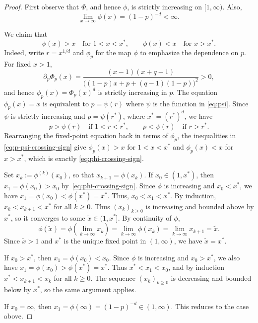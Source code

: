 \documentclass[11pt]{amsart}
\theoremstyle{plain}
\theoremstyle{definition}
\theoremstyle{remark}
\begin{document}
\begin{proof}
First observe that \(\Phi\), and hence \(\phi\), is strictly increasing on \([1,\infty)\). Also,
\[
    \lim_{x\to\infty}\phi(x)=(1-p)^{-d}<\infty.
\]

We claim that
\begin{equation}\label{eq:phi-crossing-sign}
    \phi(x)>x \quad\text{for }1<x<x^*,
    \qquad
    \phi(x)<x \quad\text{for }x>x^*.
\end{equation}
Indeed, write \(r=x^{1/d}\) and $\phi_p$ for the map $\phi$ to emphasize the dependence on $p$. For fixed \(x>1\),
\[
    \partial_p\Phi_p(x)
    =
    \frac{(x-1)(x+q-1)}
    {\bigl((1-p)x+p+(q-1)(1-p)\bigr)^2}
    >0,
\]
and hence $\phi_p(x)=\Phi_p(x)^d$ is strictly increasing in $p$. The equation \(\phi_p(x)=x\) is equivalent to \(p=\psi(r)\) where $\psi$ is the function in \eqref{eq:psi}. Since \(\psi\) is strictly increasing and \(p=\psi(r^*)\), where \(x^*=(r^*)^d\), we have
\begin{equation}\label{eq:p-psi-crossing-sign}
    p>\psi(r) \quad\text{if }1<r<r^*,
    \qquad
    p<\psi(r) \quad\text{if }r>r^*.
\end{equation}
Rearranging the fixed-point equation back in terms of \(\phi_p\), the inequalities in \eqref{eq:p-psi-crossing-sign} give \(\phi_p(x)>x\) for \(1<x<x^*\) and \(\phi_p(x)<x\) for \(x>x^*\), which is exactly \eqref{eq:phi-crossing-sign}.

Set $x_k:=\phi^{(k)}(x_0)$, so that $x_{k+1}=\phi(x_k)$. If \(x_0\in(1,x^*)\), then $x_1=\phi(x_0)>x_0$ by~\eqref{eq:phi-crossing-sign}. Since $\phi$ is increasing and $x_0<x^*$, we have $x_1=\phi(x_0)<\phi(x^*)=x^*$. Thus, $x_0<x_1<x^*$. By induction, $x_k<x_{k+1}<x^*$ for all $k\ge0$. Thus \((x_k)_{k\ge0}\) is increasing and bounded above by \(x^*\), so it converges to some $\tilde x \in (1,x^*]$. By continuity of \(\phi\),
\[
    \phi(\tilde x)
    =\phi\left(\lim_{k\to\infty}x_k\right)
    =\lim_{k\to\infty}\phi\left(x_k\right)
    =\lim_{k\to\infty}x_{k+1}
    =\tilde x.
\]
Since $\tilde x>1$ and $x^*$ is the unique fixed point in $(1, \infty)$, we have $\tilde x = x^*$.

If \(x_0>x^*\), then \(x_1=\phi(x_0)<x_0\). Since \(\phi\) is increasing and \(x_0>x^*\), we also have \(x_1=\phi(x_0)>\phi(x^*)=x^*\). Thus \(x^*<x_1<x_0\), and by induction \(x^*<x_{k+1}<x_k\) for all \(k\ge0\). The sequence $(x_k)_{k\ge0}$ is decreasing and bounded below by \(x^*\), so the same argument applies. 

If \(x_0=\infty\), then $x_1=\phi(\infty)=(1-p)^{-d}\in(1,\infty).$ This reduces to the case above.


\end{proof}
\end{document}
